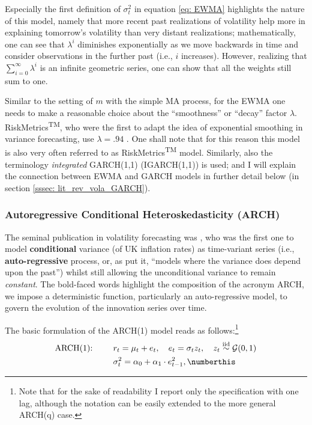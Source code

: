Especially the first definition of $\sigma_t^2$ in equation \eqref{eq: EWMA} highlights the nature of this model, namely that more recent past realizations of volatility help more in explaining tomorrow's volatility than very distant realizations; mathematically, one can see that $\lambda^{i}$ diminishes exponentially as we move backwards in time and consider observations in the further past (i.e., $i$ increases).  However, realizing that $\sum_{i=0}^\infty \lambda^{i}$ is an infinite geometric series, one can show that all the weights still sum to one. 

Similar to the setting of $m$ with the simple MA process, for the EWMA one needs to make a reasonable choice about the \enquote{smoothness} or \enquote{decay} factor $\lambda$. RiskMetrics\textsuperscript{TM}, who were the first to adapt the idea of exponential smoothing in variance forecasting, use $\lambda = .94$ \parencite[89]{RiskMetrics96}. One shall note that for this reason this model is also very often referred to as RiskMetrics\textsuperscript{TM} model. Similarly, also the terminology \emph{integrated} GARCH(1,1) (IGARCH(1,1)) is used; and I will explain the connection between EWMA and GARCH models in further detail below (in section \ref{sssec: lit_rev_vola_GARCH}).


\subsubsection{Autoregressive Conditional Heteroskedasticity (ARCH)}
\label{sssec: lit_rev_vola_ARCH}

The seminal publication in volatility forecasting was \textcite{Engle1982}, who was the first one to model \textbf{conditional} variance (of UK inflation rates) as time-variant series (i.e., \textbf{auto-regressive} process, or, as \textcite[987]{Engle1982} put it,  \enquote{models where the variance does depend upon the past}) whilst still allowing the unconditional variance to remain \emph{constant}. The bold-faced words highlight the composition of the acronym ARCH, we impose a deterministic function, particularly an auto-regressive model, to govern the evolution of the innovation series over time.

The basic formulation of the ARCH(1) model reads as follows:\footnote{Note that for the sake of readability I report only the specification with one lag, although the notation can be easily extended to the more general ARCH(q) case.}
\begin{align*}
\text{ARCH(1): }\qquad & r_t = \mu_{t} + e_{t}, \quad e_{t} = \sigma_{t} z_{t},\quad  z_{t} \overset{\text{iid}}{\sim} \mathcal{G}(0,1) \\
\label{eq: ARCH}
& \sigma_t^2 = \alpha_0 + \alpha_1 \cdot e_{t-1}^2, \numberthis
\end{align*}

